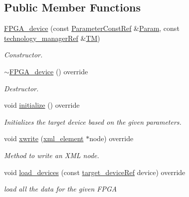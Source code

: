 \subsection*{Public Member Functions}
\begin{DoxyCompactItemize}
\item 
\hyperlink{classFPGA__device_a7c2ceb21b31c8936187ba4d44cebd653}{F\+P\+G\+A\+\_\+device} (const \hyperlink{Parameter_8hpp_a37841774a6fcb479b597fdf8955eb4ea}{Parameter\+Const\+Ref} \&\hyperlink{classtarget__device_a2ab6118c487cc65cf7fe3462c96967ec}{Param}, const \hyperlink{technology__manager_8hpp_a4b9ecd440c804109c962654f9227244e}{technology\+\_\+manager\+Ref} \&\hyperlink{classtarget__device_a941853b670a1b34eae7eab6bd21c854a}{TM})
\begin{DoxyCompactList}\small\item\em Constructor. \end{DoxyCompactList}\item 
\hyperlink{classFPGA__device_a3060491c49280b5d364d92ee8ab27934}{$\sim$\+F\+P\+G\+A\+\_\+device} () override
\begin{DoxyCompactList}\small\item\em Destructor. \end{DoxyCompactList}\item 
void \hyperlink{classFPGA__device_a67c74984f6a780600c6e4858687c7298}{initialize} () override
\begin{DoxyCompactList}\small\item\em Initializes the target device based on the given parameters. \end{DoxyCompactList}\item 
void \hyperlink{classFPGA__device_afc6da3ca7ff26af47400272956f6c397}{xwrite} (\hyperlink{classxml__element}{xml\+\_\+element} $\ast$node) override
\begin{DoxyCompactList}\small\item\em Method to write an X\+ML node. \end{DoxyCompactList}\item 
void \hyperlink{classFPGA__device_aabe12325194fdd8b0f03ed674f64419b}{load\+\_\+devices} (const \hyperlink{target__device_8hpp_acedb2b7a617e27e6354a8049fee44eda}{target\+\_\+device\+Ref} device) override
\begin{DoxyCompactList}\small\item\em load all the data for the given F\+P\+GA \end{DoxyCompactList}\end{DoxyCompactItemize}
